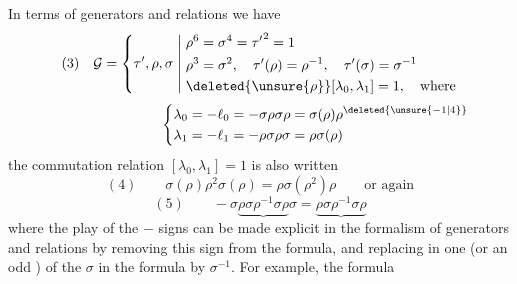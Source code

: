 In terms of generators and relations we have
\[
(3)\quad\mathcal{G}=\left\{\tau',\rho,\sigma\;\middle|\;
\begin{aligned}
&\rho^6=\sigma^4={\tau'}^2=1\\
&\rho^3=\sigma^2,\quad\tau'(\rho)=\rho^{-1},\quad\tau'(\sigma)=\sigma^{-1}\\
&\deleted{\unsure{\rho}}[\lambda_0,\lambda_1]=1,\quad\text{where}
\end{aligned}\right.
\]
\[
\hspace{8em}\left\{
\begin{aligned}
\lambda_0&=-\ell_0=-\sigma\rho\sigma\rho=\sigma(\rho)\rho^{\deleted{\unsure{-1|4}}}\\
\lambda_1&=-\ell_1=-\rho\sigma\rho\sigma=\rho\sigma(\rho)
\end{aligned}\right.
\]
 the commutation relation $[\lambda_0,\lambda_1]=1$ is also written
\[
(4)\qquad \sigma(\rho)\rho^2\sigma(\rho)=\rho\sigma(\rho^2)\rho
\qquad\text{or again}
\]
\[
(5)\qquad -\sigma\underbrace{\rho\sigma\rho^{-1}\sigma\rho}\sigma
=\underbrace{\rho\sigma\rho^{-1}\sigma\rho}
\]
where the play of the $-$ signs can be made explicit in the formalism of generators and relations by removing this sign from the formula, and replacing in  one (or an odd ) of the $\sigma$ in the formula by $\sigma^{-1}$. For example, the formula

